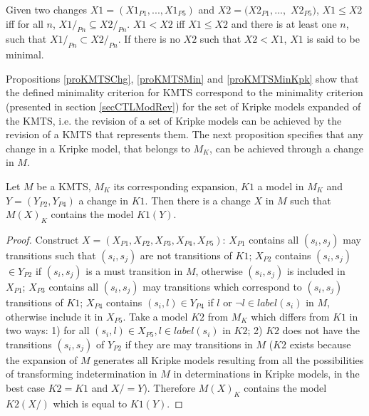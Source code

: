 \documentclass{llncs}
\begin{document}

\begin{definition}
Given two changes $X1 = (X1_{P1},...,X1_{P5})$ and $X2 = (X2_{P1},...,$ $X2_{P5})$, $X1 \leq X2$ iff for all $n$, $X1/_{Pn} \subseteq X2/_{Pn}$. $X1 < X2$ iff $X1 \leq X2$ and there is at least one $n$, such that $X1/_{Pn} \subset X2/_{Pn}$. If there is no $X2$ such that $X2 < X1$, $X1$ is said to be minimal.
\end{definition}

Propositions \ref{proKMTSChg}, \ref{proKMTSMin} and \ref{proKMTSMinKpk} show that the defined minimality criterion for KMTS correspond to the minimality criterion (presented in section \ref{secCTLModRev}) for the set of Kripke models expanded of the KMTS, i.e. the revision of a set of Kripke models can be achieved by the revision of a KMTS that represents them. The next proposition specifies that any change in a Kripke model, that belongs to $M_{K}$, can be achieved through a change in $M$.

\begin{proposition} \label{proKMTSChg}
Let $M$ be a KMTS, $M_{K}$ its corresponding expansion, $K1$ a model in $M_{K}$ and $Y = (Y_{P2}, Y_{P4})$ a change in $K1$. Then there is a change $X$ in $M$ such that $M(X)_{K}$ contains the model $K1(Y)$.
\begin{proof}
Construct $X = (X_{P1}, X_{P2}, X_{P3}, X_{P4}, X_{P5})$: $X_{P1}$ contains all $(s_{i},s_{j})$ may transitions such that $(s_{i},s_{j})$ are not transitions of $K1$; $X_{P2}$ contains $(s_{i},s_{j}) $ $\in Y_{P2}$ if $(s_{i},s_{j})$ is a must transition in $M$, otherwise $(s_{i},s_{j})$ is included in $X_{P1}$; $X_{P3}$ contains all $(s_{i},s_{j})$ may transitions which correspond to $(s_{i},s_{j})$ transitions of $K1$; $X_{P4}$ contains $(s_{i},l) \in Y_{P4}$ if $l$ or $\neg l \in label(s_{i})$ in $M$, otherwise include it in $X_{P5}$. Take a model $K2$ from $M_{K}$ which  differs from $K1$ in two ways: 1) for all $(s_{i},l) \in X_{P5}, l \in label(s_{i})$ in $K2$; 2) $K2$ does not have the transitions $(s_{i},s_{j})$ of $Y_{P2}$ if they are may transitions in $M$ ($K2$ exists because the expansion of $M$ generates all Kripke models resulting from all the possibilities of transforming indetermination in $M$ in determinations in Kripke models, in the best case $K2 = K1$ and $X/ = Y$). Therefore $M(X)_{K}$ contains the 
model $K2(X/)$ which is equal to $K1(Y)$.
\end{proof}
\end{proposition}
\end{document}
